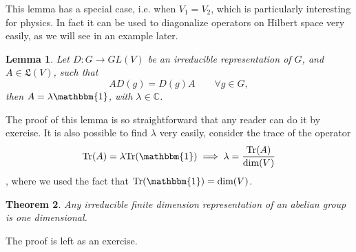 \documentclass[12pt]{book}
\theoremstyle{plain}
\newcommand{\I}{\mathbbm{1}}
\newcommand{\C}{\mathbb{C}}
\newtheorem{thm}{Theorem}[section]
\newtheorem{lem}[thm]{Lemma}
\theoremstyle{definition}
\theoremstyle{remark}
\begin{document}
This lemma has a special case, i.e. when $V_1=V_2$, which is particularly interesting for physics. In fact it can be used to diagonalize operators on Hilbert space very easily, as we will see in an example later. 
\begin{lem}\label{lemmafigo}
Let $D:G\to GL(V)$ be an irreducible representation of $G$, and $A\in \mathfrak{L}(V)$, such that
\[AD(g) = D(g)A \qquad \forall g \in G,\]
then $A=\lambda \I$, with $\lambda \in \C$.
\end{lem}
The proof of this lemma is so straightforward that any reader can do it by exercise. It is also possible to find $\lambda$ very easily, consider the trace of the operator 
\[\text{Tr}(A) = \lambda \text{Tr}(\I)\implies \lambda = \frac{\text{Tr}(A)}{\text{dim}(V)}\],
where we used the fact that $\text{Tr}(\I) = \text{dim}(V)$.
\begin{thm}
Any irreducible finite dimension representation of an abelian group is one dimensional.
\end{thm}
The proof is left as an exercise.
\end{document}
